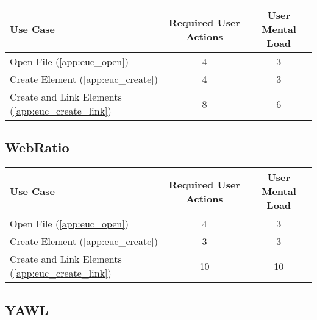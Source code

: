 \begin{tabularx}{\textwidth}{Xcc}
\textbf{Use Case} & \textbf{Required User Actions} & \textbf{User Mental Load}\\
\hline
Open File (\ref{app:euc_open})                       & 4 & 3 \\
Create Element (\ref{app:euc_create})                & 4 & 3 \\
Create and Link Elements (\ref{app:euc_create_link}) & 8 & 6
\end{tabularx}

\subsection*{WebRatio}




\begin{tabularx}{\textwidth}{Xcc}
\textbf{Use Case} & \textbf{Required User Actions} & \textbf{User Mental Load}\\
\hline
Open File (\ref{app:euc_open})                       & 4 & 3 \\
Create Element (\ref{app:euc_create})                & 3 & 3 \\
Create and Link Elements (\ref{app:euc_create_link}) & 10 & 10
\end{tabularx}

\subsection*{YAWL}

